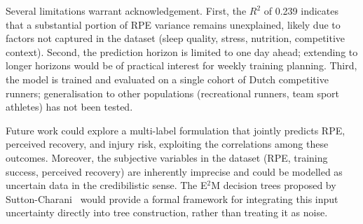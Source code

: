 \documentclass[10pt, twocolumn]{article}
\begin{document}
Several limitations warrant acknowledgement. First, the $R^2$ of
0.239 indicates that a substantial portion of RPE variance remains
unexplained, likely due to factors not captured in the dataset
(sleep quality, stress, nutrition, competitive context). Second,
the prediction horizon is limited to one day ahead; extending to
longer horizons would be of practical interest for weekly training
planning. Third, the model is trained and evaluated on a single
cohort of Dutch competitive runners; generalisation to other
populations (recreational runners, team sport athletes) has not
been tested.

Future work could explore a multi-label formulation that jointly
predicts RPE, perceived recovery, and injury risk, exploiting the
correlations among these outcomes.
Moreover, the subjective variables in the dataset (RPE, training
success, perceived recovery) are inherently imprecise and could be
modelled as uncertain data in the credibilistic sense. The E$^2$M
decision trees proposed by Sutton-Charani~\citep{suttoncharani2014}
would provide a formal framework for integrating this input uncertainty
directly into tree construction, rather than treating it as noise.
\end{document}
